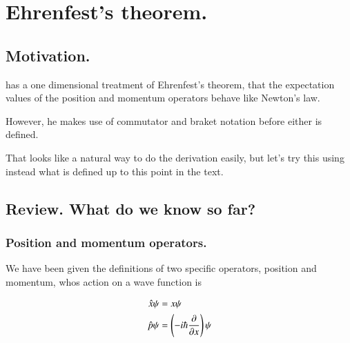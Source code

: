 
%
%


\chapter{Ehrenfest's theorem. }
\label{chap:ehrenfest}
\date{ Jan 22, 2009.  ehrenfest.tex }

%


\section{Motivation. }

\citep{mcmahon2005qmd} has a one dimensional treatment of Ehrenfest's theorem,
that the expectation values of the position and momentum operators behave
like Newton's law.

However, he makes use
of commutator and braket notation before either is defined.

That looks like a natural way to do the derivation easily, but let's try
this using instead what is defined up to this point in the text.

\section{Review.  What do we know so far? }

\subsection{Position and momentum operators. }

We have been given the definitions of two specific operators, position and momentum, 
whos action on a wave function is

\begin{align*}
\hat{x} \psi &= x \psi \\
\hat{p} \psi &= \left(-i \hbar \frac{\partial {}}{\partial {x}}\right) \psi
\end{align*}

